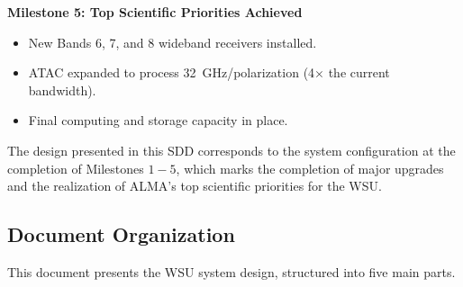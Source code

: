 \noindent\textcolor{milestoneblue}{\textbf{Milestone 5: Top Scientific Priorities Achieved}}\par
\vspace{-0.6\baselineskip}
\begin{itemize}[itemsep=-0.5em]
    \item New Bands 6, 7, and 8 wideband receivers installed.
    \item \ac{ATAC} expanded to process 32~GHz/polarization (4$\times$ the current bandwidth).
    \item Final computing and storage capacity in place.
\end{itemize}

The design presented in this \ac{SDD} corresponds to the system configuration at the completion of Milestones $1-5$, which marks the completion of major upgrades and the realization of ALMA’s top scientific priorities for the WSU.

\subsection{Document Organization}

This document presents the WSU system design, structured into five main parts.

